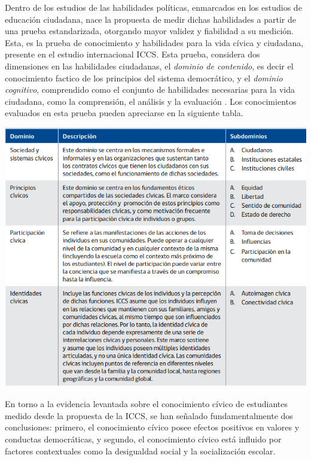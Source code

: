 \documentclass[12pt,twoside]{templates/facsothesis}
\begin{document}
Dentro de los estudios de las habilidades políticas, enmarcados en los estudios de educación ciudadana, nace la propuesta de medir dichas habilidades a partir de una prueba estandarizada, otorgando mayor validez y fiabilidad a su medición. Esta, es la prueba de conocimiento y habilidades para la vida cívica y ciudadana, presente en el estudio internacional ICCS. Esta prueba, considera dos dimensiones en las habilidades ciudadanas, el \emph{dominio de contenido}, es decir el conocimiento factico de los principios del sistema democrático, y el \emph{dominio cognitivo}, comprendido como el conjunto de habilidades necesarias para la vida ciudadana, como la comprensión, el análisis y la evaluación \citep{schulz_Estudio_2011}. Los conocimientos evaluados en esta prueba pueden apreciarse en la siguiente tabla.

\begin{center}\includegraphics[width=0.8\linewidth]{images/Contenidos} \end{center}

En torno a la evidencia levantada sobre el conocimiento cívico de estudiantes medido desde la propuesta de la ICCS, se han señalado fundamentalmente dos conclusiones: primero, el conocimiento cívico posee efectos positivos en valores y conductas democráticas, y segundo, el conocimiento cívico está influido por factores contextuales como la desigualdad social y la socialización escolar.
\end{document}
